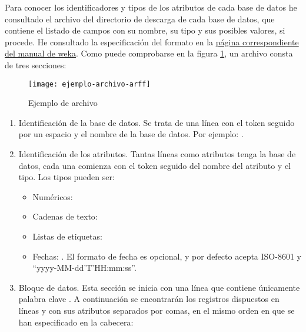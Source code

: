 Para conocer los identificadores y tipos de los atributos de cada base de datos he consultado el archivo  del directorio de descarga de cada base de datos, que contiene el listado de campos con su nombre, su tipo y sus posibles valores, si procede. He consultado la especificación del formato  en la \href{https://www.cs.waikato.ac.nz/ml/weka/arff.html}{página correspondiente del manual de weka}. Como puede comprobarse en la figura \ref{fig:ejemplo-arff}, un archivo  consta de tres secciones:
\begin{figure}[ht]
    \centering
    \texttt{[image: ejemplo-archivo-arff]}
    \caption{Ejemplo de archivo }
    \label{fig:ejemplo-arff}
\end{figure}
\begin{enumerate}
    \item Identificación de la base de datos. Se trata de una línea con el token  seguido por un espacio y el nombre de la base de datos. Por ejemplo: .
    \item Identificación de los atributos. Tantas líneas como atributos tenga la base de datos, cada una comienza con el token  seguido del nombre del atributo y el tipo. Los tipos pueden ser:
        \begin{itemize}
            \item Numéricos: 
            \item Cadenas de texto: 
            \item Listas de etiquetas: 
            \item Fechas: . El formato de fecha es opcional, y por defecto acepta ISO-8601 y ``yyyy-MM-dd'T'HH:mm:ss''.
        \end{itemize}
    \item Bloque de datos. Esta sección se inicia con una línea que contiene únicamente palabra clave . A continuación se encontrarán los registros dispuestos en líneas y con sus atributos separados por comas, en el mismo orden en que se han especificado en la cabecera:
    \begin{center}
        \parbox{5.1cm}{}
    \end{center}

\end{enumerate}

